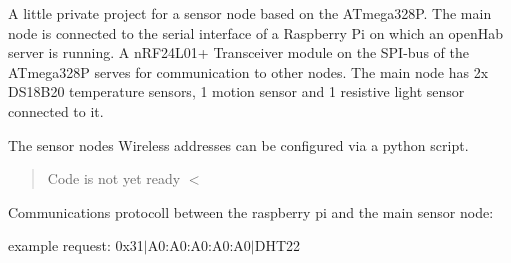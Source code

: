 A little private project for a sensor node based on the A\+Tmega328P. The main node is connected to the serial interface of a Raspberry Pi on which an open\+Hab server is running. A n\+R\+F24\+L01+ Transceiver module on the S\+P\+I-\/bus of the A\+Tmega328P serves for communication to other nodes. The main node has 2x D\+S18\+B20 temperature sensors, 1 motion sensor and 1 resistive light sensor connected to it.

The sensor nodes Wireless addresses can be configured via a python script.

\begin{quote}
Code is not yet ready $<$ \end{quote}


Communications protocoll between the raspberry pi and the main sensor node\+:

example request\+: 0x31$\vert$\+A0\+:A0\+:\+A0\+:\+A0\+:A0$\vert$\+D\+H\+T22

